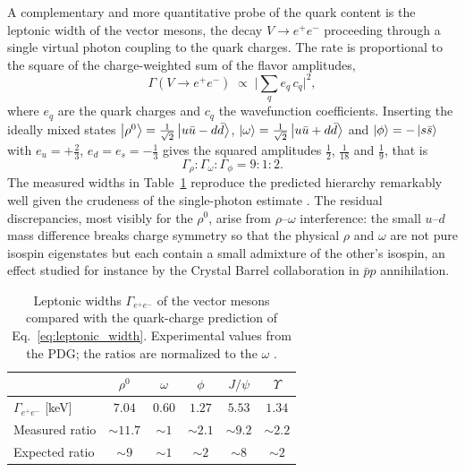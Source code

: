 A complementary and more quantitative probe of the quark content is the leptonic
width of the vector mesons, the decay $V \to e^+e^-$ proceeding through a single
virtual photon coupling to the quark charges. The rate is proportional to the square
of the charge-weighted sum of the flavor amplitudes,
\begin{equation}
    \Gamma(V \to e^+e^-) \;\propto\; \Big|\textstyle\sum_q e_q\,c_q\Big|^2,
    \label{eq:leptonic_width}
\end{equation}
where $e_q$ are the quark charges and $c_q$ the wavefunction coefficients. Inserting
the ideally mixed states $\ket{\rho^0} = \tfrac{1}{\sqrt 2}\ket{u\bar u - d\bar d}$,
$\ket{\omega} = \tfrac{1}{\sqrt 2}\ket{u\bar u + d\bar d}$ and
$\ket{\phi} = -\ket{s\bar s}$ with $e_u = +\tfrac{2}{3}$,
$e_d = e_s = -\tfrac{1}{3}$ gives the squared amplitudes $\tfrac12$, $\tfrac{1}{18}$
and $\tfrac19$, that is
\begin{equation}
    \Gamma_\rho : \Gamma_\omega : \Gamma_\phi = 9 : 1 : 2.
    \label{eq:leptonic_ratio}
\end{equation}
The measured widths in Table~\ref{tab:leptonic_widths} reproduce the predicted
hierarchy remarkably well given the crudeness of the single-photon estimate
\cite[Ch.~7]{Amsler2018}. The residual discrepancies, most visibly for the $\rho^0$,
arise from $\rho$--$\omega$ interference: the small $u$--$d$ mass difference breaks
charge symmetry so that the physical $\rho$ and $\omega$ are not pure isospin
eigenstates but each contain a small admixture of the other's isospin, an effect
studied for instance by the Crystal Barrel collaboration in $\bar p p$ annihilation.

\begin{table}[t]
    \centering
    \caption{Leptonic widths $\Gamma_{e^+e^-}$ of the vector mesons compared with
    the quark-charge prediction of Eq.~\eqref{eq:leptonic_width}. Experimental
    values from the PDG; the ratios are normalized to the $\omega$
    \cite[Ch.~7]{Amsler2018}.}
    \label{tab:leptonic_widths}
    \begin{tabular}{lccccc}
        \hline
         & $\rho^0$ & $\omega$ & $\phi$ & $J/\psi$ & $\Upsilon$ \\
        \hline
        $\Gamma_{e^+e^-}$ [keV] &
        $7.04$ & $0.60$ & $1.27$ & $5.53$ & $1.34$ \\
        Measured ratio &
        $\sim\!11.7$ & $\sim\!1$ & $\sim\!2.1$ & $\sim\!9.2$ & $\sim\!2.2$ \\
        Expected ratio &
        $\sim\!9$ & $\sim\!1$ & $\sim\!2$ & $\sim\!8$ & $\sim\!2$ \\
        \hline
    \end{tabular}
\end{table}

